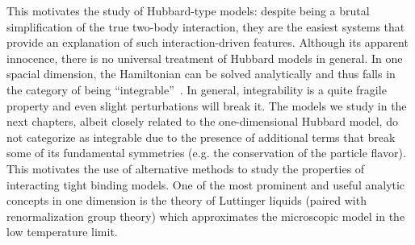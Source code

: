 This motivates the study of Hubbard-type models: despite being a brutal simplification of the true two-body interaction, they are the easiest systems that provide an explanation of such interaction-driven features.
Although its apparent innocence, there is no universal treatment of Hubbard models in general.
In one spacial dimension, the Hamiltonian can be solved analytically and thus falls in the category of being ``integrable''~\cite{Essler2005}.
In general, integrability is a quite fragile property and even slight perturbations will break it.
The models we study in the next chapters, albeit closely related to the one-dimensional Hubbard model, do not categorize as integrable due to the presence of additional terms that break some of its fundamental symmetries (e.g. the conservation of the particle flavor).
This motivates the use of alternative methods to study the properties of interacting tight binding models.
One of the most prominent and useful analytic concepts in one dimension is the theory of Luttinger liquids (paired with renormalization group theory) which approximates the microscopic model in the low temperature limit.
%
%
